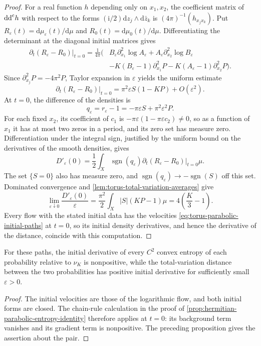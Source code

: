 \begin{proof}
For a real function $h$ depending only on $x_1,x_2$, the coefficient matrix of $\mathrm{dd}^{\mathrm{c}} h$ with respect to the forms $(\mathrm i/2)\mathrm dz_j\wedge\mathrm d\bar z_k$ is $(4\pi)^{-1}(h_{x_jx_k})$. Put $R_\varepsilon(t)=\mathrm d\mu_\varepsilon(t)/\mathrm d\mu$ and $R_0(t)=\mathrm d\mu_0(t)/\mathrm d\mu$. Differentiating the determinant at the diagonal initial matrices gives
\[
\begin{split}
 \left.\partial_t(R_\varepsilon-R_0)\right|_{t=0}
 =\frac1{4\pi}\bigl(&B_\varepsilon\partial_{x_1}^2\log A_\varepsilon
             +A_\varepsilon\partial_{x_2}^2\log B_\varepsilon\\
 &-K(B_\varepsilon-1)\partial_{x_1}^2P
             -K(A_\varepsilon-1)\partial_{x_2}^2P\bigr).
\end{split}
\]
Since $\partial_{x_j}^2P=-4\pi^2P$, Taylor expansion in $\varepsilon$ yields the uniform estimate
\[
 \left.\partial_t(R_\varepsilon-R_0)\right|_{t=0}
 =\pi^2\varepsilon S(1-KP)+O(\varepsilon^2).
\]
At $t=0$, the difference of the densities is
\[
 q_\varepsilon=r_\varepsilon-1
 =-\pi\varepsilon S+\pi^2\varepsilon^2P.
\]
For each fixed $x_2$, its coefficient of $c_1$ is $-\pi\varepsilon(1-\pi\varepsilon c_2)\ne0$, so as a function of $x_1$ it has at most two zeros in a period, and its zero set has measure zero. Differentiation under the integral sign, justified by the uniform bound on the derivatives of the smooth densities, gives
\[
 D'_\varepsilon(0)=\frac12\int_X\operatorname{sgn}(q_\varepsilon)
       \left.\partial_t(R_\varepsilon-R_0)\right|_{t=0}\mu.
\]
The set $\{S=0\}$ also has measure zero, and $\operatorname{sgn}(q_\varepsilon)\to-\operatorname{sgn}(S)$ off this set. Dominated convergence and \cref{lem:torus-total-variation-averages} give
\[
 \lim_{\varepsilon\downarrow0}\frac{D'_\varepsilon(0)}\varepsilon
 =\frac{\pi^2}2\int_X|S|(KP-1)\mu
 =4\left(\frac K3-1\right).
\]
Every flow with the stated initial data has the velocities \eqref{eq:torus-parabolic-initial-paths} at $t=0$, so its initial density derivatives, and hence the derivative of the distance, coincide with this computation.
\end{proof}

\begin{corollary}\label{cor:individual-entropy-pair-growth}
For these paths, the initial derivative of every $C^2$ convex entropy of each probability relative to $\nu_K$ is nonpositive, while the total-variation distance between the two probabilities has positive initial derivative for sufficiently small $\varepsilon>0$.
\end{corollary}
\begin{proof}
The initial velocities are those of the logarithmic flow, and both initial forms are closed. The chain-rule calculation in the proof of \cref{prop:hermitian-parabolic-entropy-identity} therefore applies at $t=0$: its background term vanishes and its gradient term is nonpositive. The preceding proposition gives the assertion about the pair.
\end{proof}
